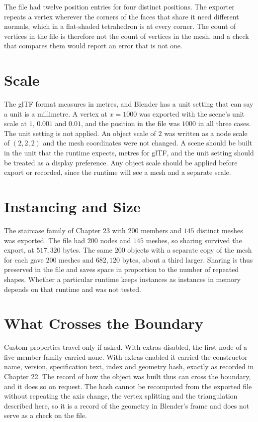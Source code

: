 The file had twelve position entries for four distinct positions. The exporter repeats a vertex wherever the corners of the faces that share it need different normals, which in a flat-shaded tetrahedron is at every corner. The count of vertices in the file is therefore not the count of vertices in the mesh, and a check that compares them would report an error that is not one.

\section{Scale}

The glTF format measures in metres, and Blender has a unit setting that can say a unit is a millimetre. A vertex at $x=1000$ was exported with the scene's unit scale at $1$, $0.001$ and $0.01$, and the position in the file was $1000$ in all three cases. The unit setting is not applied. An object scale of $2$ was written as a node scale of $(2,2,2)$ and the mesh coordinates were not changed. A scene should be built in the unit that the runtime expects, metres for glTF, and the unit setting should be treated as a display preference. Any object scale should be applied before export or recorded, since the runtime will see a mesh and a separate scale.

\section{Instancing and Size}

The staircase family of Chapter 23 with $200$ members and $145$ distinct meshes was exported. The file had $200$ nodes and $145$ meshes, so sharing survived the export, at $517{,}320$ bytes. The same $200$ objects with a separate copy of the mesh for each gave $200$ meshes and $682{,}120$ bytes, about a third larger. Sharing is thus preserved in the file and saves space in proportion to the number of repeated shapes. Whether a particular runtime keeps instances as instances in memory depends on that runtime and was not tested.

\section{What Crosses the Boundary}

Custom properties travel only if asked. With extras disabled, the first node of a five-member family carried none. With extras enabled it carried the constructor name, version, specification text, index and geometry hash, exactly as recorded in Chapter 22. The record of how the object was built thus can cross the boundary, and it does so on request. The hash cannot be recomputed from the exported file without repeating the axis change, the vertex splitting and the triangulation described here, so it is a record of the geometry in Blender's frame and does not serve as a check on the file.

